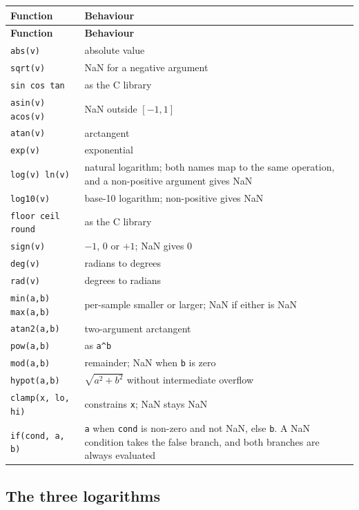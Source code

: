 \documentclass[11pt,a4paper,oneside]{report}
\newcommand{\code}[1]{\texttt{#1}}
\begin{document}
\begin{center}
\small
\begin{longtable}{@{}p{}p{}@{}}
\toprule
\textbf{Function} & \textbf{Behaviour} \\
\midrule
\endfirsthead
\toprule
\textbf{Function} & \textbf{Behaviour} \\
\midrule
\endhead
\code{abs(v)} & absolute value \\
\code{sqrt(v)} & NaN for a negative argument \\
\code{sin cos tan} & as the C library \\
\code{asin(v) acos(v)} & NaN outside $[-1, 1]$ \\
\code{atan(v)} & arctangent \\
\code{exp(v)} & exponential \\
\code{log(v) ln(v)} & natural logarithm; both names map to the same operation, and a non-positive argument gives NaN \\
\code{log10(v)} & base-10 logarithm; non-positive gives NaN \\
\code{floor ceil round} & as the C library \\
\code{sign(v)} & $-1$, 0 or $+1$; NaN gives 0 \\
\code{deg(v)} & radians to degrees \\
\code{rad(v)} & degrees to radians \\
\code{min(a,b) max(a,b)} & per-sample smaller or larger; NaN if either is NaN \\
\code{atan2(a,b)} & two-argument arctangent \\
\code{pow(a,b)} & as \code{a\textasciicircum b} \\
\code{mod(a,b)} & remainder; NaN when \code{b} is zero \\
\code{hypot(a,b)} & $\sqrt{a^2 + b^2}$ without intermediate overflow \\
\code{clamp(x, lo, hi)} & constrains \code{x}; NaN stays NaN \\
\code{if(cond, a, b)} & \code{a} when \code{cond} is non-zero and not NaN, else \code{b}. A NaN condition takes the false branch, and both branches are always evaluated \\
\bottomrule
\end{longtable}
\end{center}

\subsection{The three logarithms}
\end{document}
